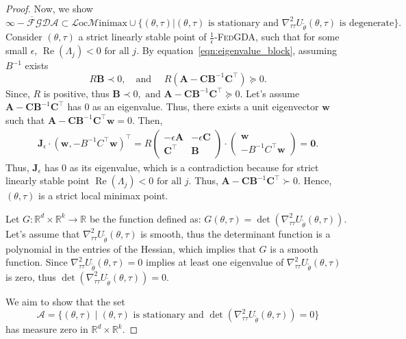 \documentclass{article}
\def\vw{{\bm{w}}}
\def\mA{{\bm{A}}}
\def\mB{{\bm{B}}}
\def\mC{{\bm{C}}}
\def\mJ{{\bm{J}}}
\def\gA{{\mathcal{A}}}
\def\gM{{\mathcal{M}}}
\def\emLambda{{\Lambda}}
\newcommand{\fgda}{\textsc{FedGDA}\xspace}
\theoremstyle{definition}
\begin{document}
\begin{proof}
    Now, we show $\overline{\infty-\mathcal{FGDA}}\subset\mathcal{L}\text{oc}\gM\text{inimax}\cup\{(\theta,\tau)|(\theta,\tau)\text{ is stationary and }\nabla_{\tau\tau}^2U_{\tilde\theta}(\theta, \tau)\text{ is degenerate}\}.$
    Consider  $(\theta,\tau)$ a strict linearly stable point of $\frac{1}{\epsilon}$-\fgda, such that for some small $\epsilon$,  $\operatorname{Re}(\emLambda_j) < 0 \text{ for all } j.$ By equation~\ref{eqn:eigenvalue_block}, assuming $B^{-1}$ exists
    \begin{equation*}
        R\mB\prec 0,\quad\text{and }\quad R(\mA-\mC\mB^{-1}\mC^\top)\succeq 0. 
    \end{equation*}
    Since, $R$ is positive, thus $\mB\prec 0,\text{ and }\mA-\mC\mB^{-1}\mC^\top\succeq 0.$ Let's assume $\mA-\mC\mB^{-1}\mC^\top$ has $0$ as an eigenvalue. Thus, there exists a unit eigenvector $\vw$ such that $\mA-\mC\mB^{-1}\mC^\top\vw=0$. Then,
    \begin{align*}
            \mJ_{\epsilon}\cdot(\vw,-B^{-1}C^\top\vw)^\top=
       R \begin{pmatrix}
       -\epsilon\mA & -\epsilon \mC\\
       \mC^\top & \mB
    \end{pmatrix}
    \cdot
    \begin{pmatrix}
        \vw \\-B^{-1}C^\top\vw
    \end{pmatrix}=\mathbf{0}.
    \end{align*}
    Thus, $\mJ_{\epsilon}$ has $0$ as its eigenvalue, which is a contradiction because for strict linearly stable point $\operatorname{Re}(\emLambda_j) < 0 \text{ for all } j$. Thus, $\mA-\mC\mB^{-1}\mC^\top\succ0$. Hence, $(\theta,\tau)$ is a strict local minimax point.

    Let $G: \mathbb{R}^d \times \mathbb{R}^k \to \mathbb{R}$ be the function defined as:
$G(\theta, \tau) = \det(\nabla_{\tau\tau}^2 U_{\tilde\theta}(\theta, \tau)).$
Let's assume that $\nabla_{\tau\tau}^2 U_{\tilde\theta}(\theta, \tau)$ is smooth, thus the determinant function is a polynomial in the entries of the Hessian, which implies that $G$ is a smooth function. Since $\nabla_{\tau\tau}^2 U_{\tilde\theta}(\theta, \tau)=0$ implies at least one eigenvalue of $\nabla_{\tau\tau}^2 U_{\tilde\theta}(\theta, \tau)$ is zero, thus $\det(\nabla_{\tau\tau}^2 U_{\tilde\theta}(\theta, \tau))=0$.

We aim to show that the set 
$$\gA = \{ (\theta, \tau) \mid (\theta, \tau) \text{ is stationary and } \det(\nabla_{\tau\tau}^2 U_{\tilde\theta}(\theta, \tau)) = 0 \}$$
has measure zero in $\mathbb{R}^{d} \times \mathbb{R}^k$.


\end{proof}
\end{document}
